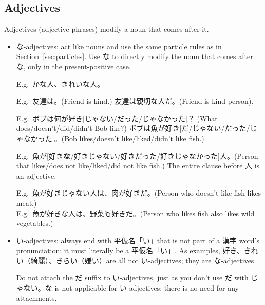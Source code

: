 \documentclass[../nihongo-gakushuu-kyouzai.tex]{subfiles}
\begin{document}
\subsection{Adjectives}
Adjectives (adjective phrases) modify a noun that comes after it.
\begin{itemize}
    \item な-adjectives: act like nouns and use the same particle rules as in Section~\ref{sec:particles}. Use な to directly modify the noun that comes after な, only in the present-positive case.


    E.g.\ かな人、きれいな人。

    E.g.\ 友達は。(Friend is kind.) 友達は親切な人だ。(Friend is kind person).

    E.g.\ ボブは何が好き[じゃない/だった/じゃなかった]？ (What does/doesn't/did/didn't Bob like?) ボブは魚が好き[だ/じゃない/だった/じゃなかった]。(Bob likes/doesn't like/liked/didn't like fish.)

    E.g.\ 魚が[好き\textbf{な}/好きじゃない/好きだった/好きじゃなかった]人。(Person that likes/does not like/liked/did not like fish.) The entire clause before 人 is an adjective.

    E.g.\ 魚が好きじゃない人は、肉が好きだ。(Person who doesn't like fish likes meat.)\\
    E.g.\ 魚が好きな人は、野菜も好きだ。(Person who likes fish also likes wild vegetables.)

    \item い-adjectives: always end with 平仮名「い」that is \ul{not} part of a 漢字 word's pronunciation: it must literally be a 平仮名「い」. As examples, 好き、きれい（綺麗）、きらい（嫌い）are all not い-adjectives; they are な-adjectives. 


    Do not attach the だ suffix to い-adjectives, just as you don't use だ with じゃない。な is not applicable for い-adjectives: there is no need for any attachments.


\end{itemize}
\end{document}
